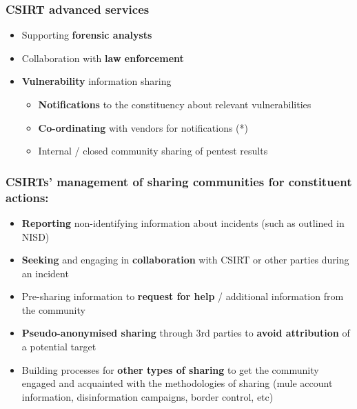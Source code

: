 

\begin{frame}
\frametitle{CSIRT advanced services}
\begin{itemize}
	\item Supporting {\bf forensic analysts}
	\item Collaboration with {\bf law enforcement}
	\item {\bf Vulnerability} information sharing
	\begin{itemize}
		\item {\bf Notifications} to the constituency about relevant vulnerabilities
		\item {\bf Co-ordinating} with vendors for notifications (*)
		\item Internal / closed community sharing of pentest results
	\end{itemize}
\end{itemize}
\end{frame}


\begin{frame}
\frametitle{CSIRTs' management of sharing communities for constituent actions:}
\begin{itemize}
	\item {\bf Reporting} non-identifying information about incidents (such as outlined in NISD)
	\item {\bf Seeking} and engaging in {\bf collaboration} with CSIRT or other parties during an incident
	\item Pre-sharing information to {\bf request for help} / additional information from the community
	\item {\bf Pseudo-anonymised sharing} through 3rd parties to {\bf avoid attribution} of a potential target
	\item Building processes for {\bf other types of sharing} to get the community engaged and acquainted with the methodologies of sharing (mule account information, disinformation campaigns, border control, etc)
\end{itemize}
\end{frame}

